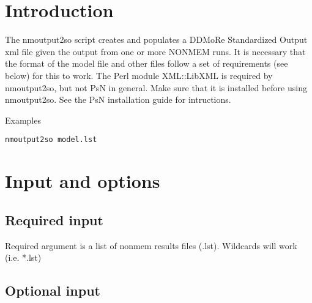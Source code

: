 



\maketitle

\section{Introduction}
The nmoutput2so script creates and populates a DDMoRe Standardized Output 
\cite{Terranova}
xml file given the output from one or more NONMEM runs. 
It is necessary that the format of the model file and other files follow a set of requirements (see below) for this to work. The Perl module XML::LibXML is required by nmoutput2so, but not PsN in general. Make sure that it is installed before using nmoutput2so. See the PsN installation guide for intructions.


Examples
\begin{verbatim}
nmoutput2so model.lst
\end{verbatim}

\section{Input and options}

\subsection{Required input}
Required argument is a list of nonmem results files (.lst). Wildcards will work (i.e. *.lst)


\subsection{Optional input}

